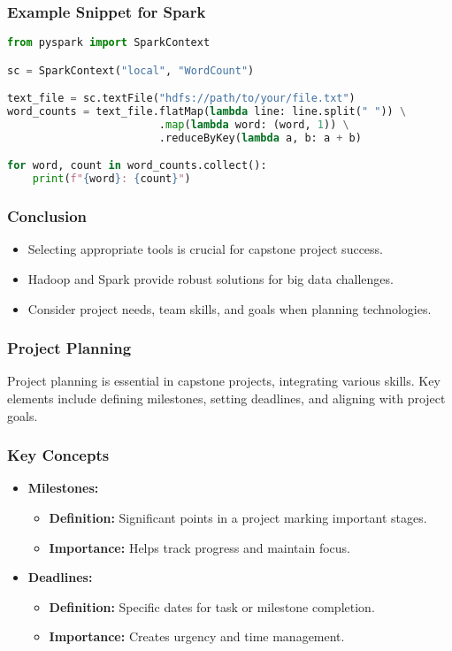 \documentclass[aspectratio=169]{beamer}
\begin{document}
\begin{frame}[fragile]
    \frametitle{Example Snippet for Spark}
    \begin{lstlisting}[language=Python]
from pyspark import SparkContext

sc = SparkContext("local", "WordCount")

text_file = sc.textFile("hdfs://path/to/your/file.txt")
word_counts = text_file.flatMap(lambda line: line.split(" ")) \
                        .map(lambda word: (word, 1)) \
                        .reduceByKey(lambda a, b: a + b)

for word, count in word_counts.collect():
    print(f"{word}: {count}")
    \end{lstlisting}
\end{frame}

\begin{frame}[fragile]
    \frametitle{Conclusion}
    \begin{itemize}
        \item Selecting appropriate tools is crucial for capstone project success.
        \item Hadoop and Spark provide robust solutions for big data challenges.
        \item Consider project needs, team skills, and goals when planning technologies.
    \end{itemize}
\end{frame}

\begin{frame}[fragile]
  \frametitle{Project Planning}
  Project planning is essential in capstone projects, integrating various skills. 
  Key elements include defining milestones, setting deadlines, and aligning with project goals.
\end{frame}

\begin{frame}[fragile]
  \frametitle{Key Concepts}
  \begin{itemize}
    \item \textbf{Milestones:}
    \begin{itemize}
      \item \textbf{Definition:} Significant points in a project marking important stages.
      \item \textbf{Importance:} Helps track progress and maintain focus.
    \end{itemize}

    \item \textbf{Deadlines:}
    \begin{itemize}
      \item \textbf{Definition:} Specific dates for task or milestone completion.
      \item \textbf{Importance:} Creates urgency and time management.
    \end{itemize}
  \end{itemize}
\end{frame}
\end{document}
